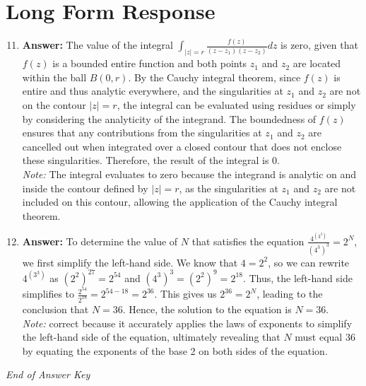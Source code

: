 \documentclass[12pt]{article}
\begin{document}
\section*{Long Form Response}
\begin{enumerate}[label=\arabic*.]
\setcounter{enumi}{10}
\item \textbf{Answer:} The value of the integral \( \int_{|z|=r} \frac{f(z)}{(z-z_1)(z-z_2)} dz \) is zero, given that \( f(z) \) is a bounded entire function and both points \( z_1 \) and \( z_2 \) are located within the ball \( B(0,r) \). By the Cauchy integral theorem, since \( f(z) \) is entire and thus analytic everywhere, and the singularities at \( z_1 \) and \( z_2 \) are not on the contour \( |z|=r \), the integral can be evaluated using residues or simply by considering the analyticity of the integrand. The boundedness of \( f(z) \) ensures that any contributions from the singularities at \( z_1 \) and \( z_2 \) are cancelled out when integrated over a closed contour that does not enclose these singularities. Therefore, the result of the integral is \( 0 \).
\\ \textit{Note:} The integral evaluates to zero because the integrand is analytic on and inside the contour defined by \( |z|=r \), as the singularities at \( z_1 \) and \( z_2 \) are not included on this contour, allowing the application of the Cauchy integral theorem.
\item \textbf{Answer:} To determine the value of \( N \) that satisfies the equation \( \frac{4^{(3^3)}}{(4^3)^3} = 2^N \), we first simplify the left-hand side. We know that \( 4 = 2^2 \), so we can rewrite \( 4^{(3^3)} \) as \( (2^2)^{27} = 2^{54} \) and \( (4^3)^3 = (2^2)^9 = 2^{18} \). Thus, the left-hand side simplifies to \( \frac{2^{54}}{2^{18}} = 2^{54 - 18} = 2^{36} \). This gives us \( 2^{36} = 2^N \), leading to the conclusion that \( N = 36 \). Hence, the solution to the equation is \( N = 36 \).
\\ \textit{Note:} correct because it accurately applies the laws of exponents to simplify the left-hand side of the equation, ultimately revealing that \( N \) must equal 36 by equating the exponents of the base 2 on both sides of the equation.
\end{enumerate}

\vfill
\noindent\textit{End of Answer Key}
\end{document}
